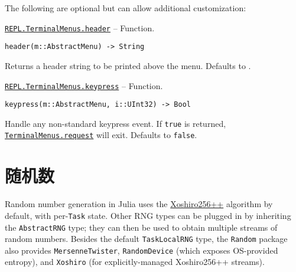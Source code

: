 The following are optional but can allow additional customization:


\hypertarget{9865193058867397819}{}
\hyperlink{9865193058867397819}{\texttt{REPL.TerminalMenus.header}}  -- {Function.}

\begin{adjustwidth}{2em}{0pt}


\begin{verbatim}
header(m::AbstractMenu) -> String
\end{verbatim}

Returns a header string to be printed above the menu. Defaults to {\textquotedbl}{\textquotedbl}.



\end{adjustwidth}
\hypertarget{18123826692360609507}{}
\hyperlink{18123826692360609507}{\texttt{REPL.TerminalMenus.keypress}}  -- {Function.}

\begin{adjustwidth}{2em}{0pt}


\begin{verbatim}
keypress(m::AbstractMenu, i::UInt32) -> Bool
\end{verbatim}

Handle any non-standard keypress event. If \texttt{true} is returned, \hyperlink{6305836527176008123}{\texttt{TerminalMenus.request}} will exit. Defaults to \texttt{false}.



\end{adjustwidth}

\hypertarget{686205674013349701}{}


\chapter{随机数}





Random number generation in Julia uses the \href{https://prng.di.unimi.it/}{Xoshiro256++} algorithm by default, with per-\texttt{Task} state. Other RNG types can be plugged in by inheriting the \texttt{AbstractRNG} type; they can then be used to obtain multiple streams of random numbers. Besides the default \texttt{TaskLocalRNG} type, the \texttt{Random} package also provides \texttt{MersenneTwister}, \texttt{RandomDevice} (which exposes OS-provided entropy), and \texttt{Xoshiro} (for explicitly-managed Xoshiro256++ streams).



